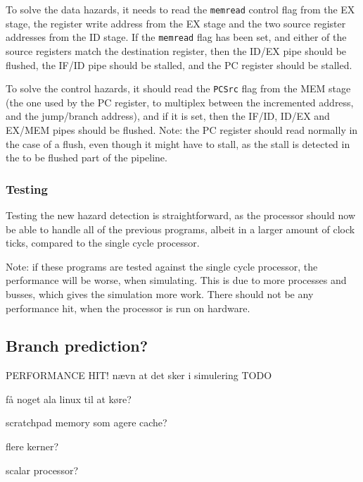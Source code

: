 To solve the data hazards, it needs to read the \texttt{memread} control flag
from the EX stage, the register write address from the EX stage and the two
source register addresses from the ID stage. If the \texttt{memread} flag has
been set, and either of the source registers match the destination register,
then the ID/EX pipe should be flushed, the IF/ID pipe should be stalled, and
the PC register should be stalled.

To solve the control hazards, it should read the \texttt{PCSrc} flag from the
MEM stage (the one used by the PC register, to multiplex between the
incremented address, and the jump/branch address), and if it is set, then the
IF/ID, ID/EX and EX/MEM pipes should be flushed. Note: the PC register should
read normally in the case of a flush, even though it might have to stall, as
the stall is detected in the to be flushed part of the pipeline.

\subsubsection*{Testing}
Testing the new hazard detection is straightforward, as the processor should
now be able to handle all of the previous programs, albeit in a larger amount
of clock ticks, compared to the single cycle processor.

Note: if these programs are tested against the single cycle processor, the
performance will be worse, when simulating. This is due to more processes and
busses, which gives the simulation more work. There should not be any
performance hit, when the processor is run on hardware.

\subsection{Branch prediction?} PERFORMANCE HIT! nævn at det sker i simulering
TODO

få noget ala linux til at køre?

scratchpad memory som agere cache?

flere kerner?

scalar processor?



